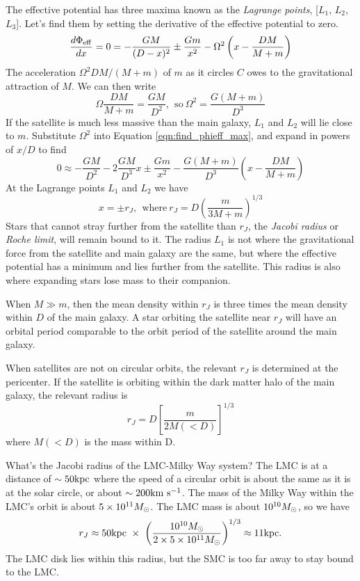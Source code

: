 \documentclass[]{article}
\begin{document}
The effective potential has three maxima known as the {\it Lagrange points}, [$L_1$, $L_2$, $L_3$].  Let's find them by setting
the derivative of the effective potential to zero.
\begin{equation}
\label{eqn:find_phieff_max}
\frac{d\Phi_\mathrm{eff}}{dx} = 0 = -\frac{GM}{(D-x)^2} \pm \frac{Gm}{x^2} - \Omega^2\left(x-\frac{DM}{M+m}\right)
\end{equation}
\noindent
The acceleration $\Omega^2DM/(M+m)$ of $m$ as it circles $C$ owes to the gravitational
attraction of $M$. We can then write
\begin{equation}
\Omega\frac{DM}{M+m}=\frac{GM}{D^2},~~\mathrm{so}~\Omega^2=\frac{G(M+m)}{D^3}
\end{equation}
\noindent
If the satellite is much less massive than the main galaxy, $L_1$ and $L_2$ will lie close to $m$.
Substitute $\Omega^2$ into Equation \ref{eqn:find_phieff_max}, and expand in powers of $x/D$ to find
\begin{equation}
0 \approx -\frac{GM}{D^2} - 2\frac{GM}{D^3}x \pm \frac{Gm}{x^2} - \frac{G(M+m)}{D^3}\left(x-\frac{DM}{M+m}\right)
\end{equation}
\noindent
At the Lagrange points $L_1$ and $L_2$ we have
\begin{equation}
x = \pm r_J, ~~\mathrm{where}~r_J = D\left(\frac{m}{3M+m}\right)^{1/3}
\end{equation}
\noindent
Stars that cannot stray further from the satellite than $r_J$, the {\it Jacobi radius} or {\it Roche limit},
will remain bound to it.  The radius $L_1$ is not where the gravitational force from the satellite and 
main galaxy are the same, but where the effective potential has a minimum and lies further from the satellite.
This radius is also where expanding stars lose mass to their companion.

When $M\gg m$, then the mean density within $r_J$ is three times the mean density within $D$ of the main galaxy.
A star orbiting the satellite near $r_J$ will have an orbital period comparable to the orbit period of the
satellite around the main galaxy.

When satellites are not on circular orbits, the relevant $r_J$ is determined at the pericenter. If the
satellite is orbiting within the dark matter halo of the main galaxy, the relevant radius is
\begin{equation}
r_J = D\left[\frac{m}{2M(<D)}\right]^{1/3}
\end{equation}
where $M(<D)$ is the mass within D.

What's the Jacobi radius of the LMC-Milky Way system? The LMC is at a distance of $\sim50\mathrm{kpc}$ where
the speed of a circular orbit is about the same as it is at the solar circle, or about $\sim200\mathrm{km}~\mathrm{s}^{-1}$.
The mass of the Milky Way within the LMC's orbit is about $5\times10^{11}M_{\odot}$.  The LMC mass is about
$10^{10}M_{\odot}$, so we have
\begin{equation}
r_J\approx 50\mathrm{kpc}~\times~\left(\frac{10^{10}M_{\odot}}{2\times5\times10^{11}M_{\odot}}\right)^{1/3} \approx 11\mathrm{kpc}.
\end{equation}
The LMC disk lies within this radius, but the SMC is too far away to stay bound to the LMC.
\end{document}
